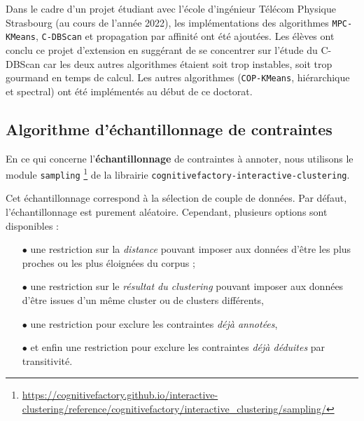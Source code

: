 	\begin{leftBarInformation}
		Dans le cadre d'un projet étudiant avec l'école d'ingénieur Télécom Physique Strasbourg (au cours de l'année 2022), les implémentations des algorithmes \texttt{MPC-KMeans}, \texttt{C-DBScan} et propagation par affinité ont été ajoutées. Les élèves ont conclu ce projet d'extension en suggérant de se concentrer sur l'étude du C-DBScan car les deux autres algorithmes étaient soit trop instables, soit trop gourmand en temps de calcul.
		Les autres algorithmes (\texttt{COP-KMeans}, hiérarchique et spectral) ont été implémentés au début de ce doctorat.
	\end{leftBarInformation}
	
	
	\subsection{Algorithme d'échantillonnage de contraintes}
	\label{annex:C.1.4-DESCRIPTION-IMPLEMENTATION-INTERACTIVE-CLUSTERING-ALGORITHMES-ECHANTILLONNAGE-DE-CONTRAINTES}
	
	En ce qui concerne l'\textbf{échantillonnage} de contraintes à annoter, nous utilisons le module \texttt{sampling} \footnote{
		\url{https://cognitivefactory.github.io/interactive-clustering/reference/cognitivefactory/interactive_clustering/sampling/}
	} de la librairie \texttt{cognitivefactory-interactive-clustering}.
	
	Cet échantillonnage correspond à la sélection de couple de données.
	Par défaut, l'échantillonnage est purement aléatoire.
	Cependant, plusieurs options sont disponibles :
	
	\begin{itemize}
		\item[\(\bullet\)] une restriction sur la \textit{distance} pouvant imposer aux données d'être les plus proches ou les plus éloignées du corpus ;
		\item[\(\bullet\)] une restriction sur le \textit{résultat du clustering} pouvant imposer aux données d'être issues d'un même cluster ou de clusters différents,
		\item[\(\bullet\)] une restriction pour exclure les contraintes \textit{déjà annotées},
		\item[\(\bullet\)] et enfin une restriction pour exclure les contraintes \textit{déjà déduites} par transitivité.
	\end{itemize}
	
